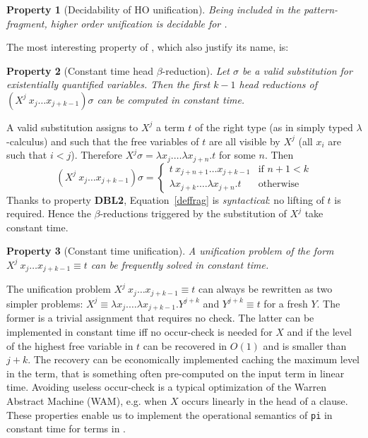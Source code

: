 \documentclass{llncs}
\newtheorem{myprop}{Property}
\begin{document}
\begin{myprop}[Decidability of HO unification]
Being \rff{} included in the pattern-fragment, higher order unification is
decidable for \rff{}.
\end{myprop}

The most interesting property of \rff{}, which also justify its name, is:

\begin{myprop}[Constant time head $\beta$-reduction]
Let $\sigma$ be a \emph{valid} substitution for existentially quantified variables. Then the first $k-1$ head reductions of $(X^j~x_j \ldots x_{j+k-1}) \sigma$ can be computed in constant time.
\end{myprop}

A valid substitution assigns to $X^j$ a term $t$ of the right type (as in simply
typed $\lambda$-calculus) and such that the free variables of $t$ are
all visible by $X^j$ (all $x_i$ are such that $i < j$).
Therefore $X^j \sigma = \lambda x_j. \ldots \lambda x_{j+n}.t$ for some $n$.
Then
\begin{equation}\label{deffrag}(X^j~x_j \ldots x_{j+k-1}) \sigma
 = \left\{ \begin{array}{ll}
t~x_{j+n+1} \ldots x_{j+k-1} & \mbox{if $n+1 < k$} \\
\lambda x_{j+k}. \ldots \lambda x_{j+n}.t & \mbox{otherwise}
      \end{array} \right.\end{equation}
Thanks to property \textbf{DBL2}, Equation~\ref{deffrag} is
\emph{syntactical}: no lifting of $t$ is required.
Hence the $\beta$-reductions triggered by the substitution of $X^j$ take
constant time.

\begin{myprop}[Constant time unification]
A unification problem of the form $X^j~x_j\ldots x_{j+k-1} \equiv t$
can be frequently solved in constant time.
\end{myprop}

The unification problem $X^j~x_j\ldots x_{j+k-1} \equiv t$ can always be
rewritten as two simpler problems: $X^j \equiv \lambda x_j. \ldots \lambda x_{j+k-1}. Y^{j+k}$ and $Y^{j+k} \equiv t$ for a fresh $Y$.
The former is a trivial assignment that requires no check.
The latter can be implemented in constant time iff no occur-check is needed
for $X$ and if the level of the highest free variable in $t$ can be recovered
in $O(1)$ and is smaller than $j+k$. The recovery can be economically
implemented caching the maximum level in the term, that is something often
pre-computed on the input term in linear time.
Avoiding useless occur-check is a typical optimization of the Warren Abstract
Machine (WAM), e.g. when $X$ occurs linearly in the head of a clause.
These properties enable us to implement the operational semantics of \verb+pi+
in constant time for terms in \rff{}.
\end{document}
